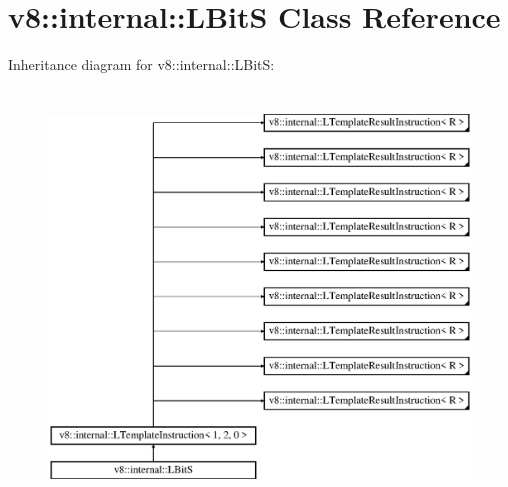 \hypertarget{classv8_1_1internal_1_1_l_bit_s}{}\section{v8\+:\+:internal\+:\+:L\+BitS Class Reference}
\label{classv8_1_1internal_1_1_l_bit_s}
Inheritance diagram for v8\+:\+:internal\+:\+:L\+BitS\+:\begin{figure}[H]
\begin{center}
\leavevmode
\includegraphics[height=11.000000cm]{classv8_1_1internal_1_1_l_bit_s}
\end{center}
\end{figure}

